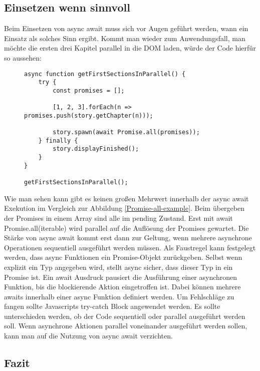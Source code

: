 \subsection{Einsetzen wenn sinnvoll}

Beim Einsetzen von async await muss sich vor Augen geführt werden, wann ein Einsatz als solches Sinn ergibt. Kommt man wieder zum Anwendungsfall, man möchte die ersten drei Kapitel parallel in die DOM laden, würde der Code hierfür so aussehen:

\begin{figure}[H]
\begin{lstlisting}[basicstyle=\small]
async function getFirstSectionsInParallel() {
    try {
        const promises = [];

        [1, 2, 3].forEach(n => promises.push(story.getChapter(n)));

        story.spawn(await Promise.all(promises));
    } finally {
        story.displayFinished();
    }
}

getFirstSectionsInParallel();
\end{lstlisting}
\end{figure}

\noindent
Wie man sehen kann gibt es keinen großen Mehrwert innerhalb der async await Exekution im Vergleich zur Abbildung \ref{Promise-all-example}. Beim übergeben der Promises in einem Array sind alle im pending Zustand. Erst mit await Promise.all(iterable) wird parallel auf die Auflösung der Promises gewartet. Die Stärke von async await kommt erst dann zur Geltung, wenn mehrere asynchrone Operationen sequentiell ausgeführt werden müssen. Als Faustregel kann festgelegt werden, dass async Funktionen ein Promise-Objekt zurückgeben. Selbst wenn explizit ein Typ angegeben wird, stellt async sicher, dass dieser Typ in ein Promise ist. Ein await Ausdruck pausiert die Ausführung einer asynchronen Funktion, bis die blockierende Aktion eingetroffen ist. Dabei können mehrere awaits innerhalb einer async Funktion definiert werden. Um Fehlschläge zu fangen sollte Javascripts try-catch Block angewendet werden. Es sollte unterschieden werden, ob der Code sequentiell oder parallel ausgeführt werden soll. Wenn asynchrone  Aktionen parallel voneinander ausgeführt werden sollen, kann man auf die Nutzung von async await verzichten.

\subsection{Fazit}

